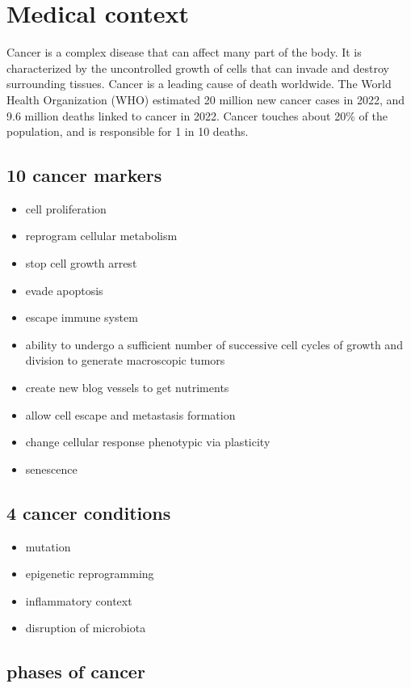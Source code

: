 \section{Medical context}

Cancer is a complex disease that can affect many part of the body.
It is characterized by the uncontrolled growth of cells that can invade and destroy surrounding tissues.
Cancer is a leading cause of death worldwide.
The World Health Organization (WHO) estimated 20 million new cancer cases in 2022, and 9.6 million deaths linked to cancer in 2022.
Cancer touches about 20\% of the population, and is responsible for 1 in 10 deaths.


\subsection{10 cancer markers}
\begin{itemize}
	\item cell proliferation
	\item reprogram cellular metabolism
	\item stop cell growth arrest
	\item evade apoptosis
	\item escape immune system
	\item ability to undergo a sufficient number of successive cell cycles of growth and division to generate macroscopic tumors
	\item create new blog vessels to get nutriments
	\item allow cell escape and metastasis formation
	\item change cellular response phenotypic via plasticity
	\item senescence
\end{itemize}

\subsection{4 cancer conditions}
\begin{itemize}
	\item mutation
	\item epigenetic reprogramming
	\item inflammatory context
	\item disruption of microbiota
\end{itemize}

\subsection{phases of cancer}
